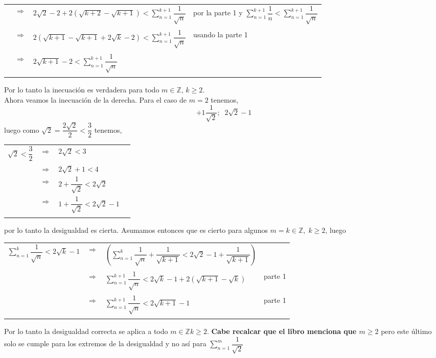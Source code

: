 \begin{enumerate}
\begin{center}
\begin{tabular}{r c l l}
&$\Rightarrow$&$2\sqrt{2} - 2 + 2(\sqrt{k+2} - \sqrt{k+1}) < \sum\limits_{n=1}^{k+1} \dfrac{1}{\sqrt{n}}$& por la parte 1 y $\sum\limits_{n=1}^{k+1} \dfrac{1}{n}<\sum\limits_{n=1}^{k+1} \dfrac{1}{\sqrt{n}}$\\\\
&$\Rightarrow$&$2(\sqrt{k+1} - \sqrt{k+1} + 2\sqrt{k} -2) < \sum\limits_{n=1}^{k+1} \dfrac{1}{\sqrt{n}}$&usando la parte 1\\\\
&$\Rightarrow$&$2\sqrt{k+1} - 2 < \sum_{n=1}^{k+1} \dfrac{1}{\sqrt{n}}$&\\\\
\end{tabular}
\end{center}
\end{enumerate}
Por lo tanto la inecuación es verdadera para todo $m \in \mathbb{Z}$, $k\geq 2.$\\
Ahora veamos la inecuación de la derecha. Para el caso de $m=2$ tenemos,
$$+1\dfrac{1}{\sqrt{2}}; \; \; 2\sqrt{2} - 1$$
luego como $\sqrt{2} = \dfrac{2\sqrt{2}}{2}< \dfrac{3}{2}$ tenemos,
\begin{center}
\begin{tabular}{rcll}
$\sqrt{2}< \dfrac{3}{2}$&$\Rightarrow$&$2\sqrt{2}<3$&\\
&$\Rightarrow$&$2\sqrt{2} + 1 < 4$&\\
&$\Rightarrow$&$2 + \dfrac{1}{\sqrt{2}}< 2\sqrt{2}$&\\
&$\Rightarrow$&$1 + \dfrac{1}{\sqrt{2}}<2 \sqrt{2} -1$&\\\\
\end{tabular}
\end{center} 
por lo tanto la desigualdad es cierta. Asumamos entonces que es cierto para algunos $m = k \in \mathbb{Z}, \; k\geq 2$, luego
\begin{center}
\begin{tabular}{rcll}
$\sum\limits_{n=1}^k \dfrac{1}{\sqrt{n}} < 2\sqrt{k} - 1$&$\Rightarrow$&$\left( \sum\limits_{n=1}^k \dfrac{1}{\sqrt{n}} + \dfrac{1}{\sqrt{k+1}} < 2 \sqrt{2} -1 + \dfrac{1}{\sqrt{k+1}}\right)$&\\\\
&$\Rightarrow$&$\sum\limits_{n=1}^{k+1} \dfrac{1}{\sqrt{n}} < 2\sqrt{k} - 1 + 2(\sqrt{k+1} - \sqrt{k})$&parte 1\\\\
&$\Rightarrow$&$\sum\limits_{n=1}^{k+1} \dfrac{1}{\sqrt{n}} < 2\sqrt{k+1} - 1$&parte 1 \\\\
\end{tabular}
\end{center}
Por lo tanto la desigualdad correcta se aplica a todo $m \in \mathbb{Z} k \geq 2$.
\textbf{Cabe recalcar que el libro menciona que $m\geq 2$} pero este último solo se cumple para los extremos de la desigualdad y no así para $\sum\limits_{n=1}^m \dfrac{1}{\sqrt{2}}$\\\\

